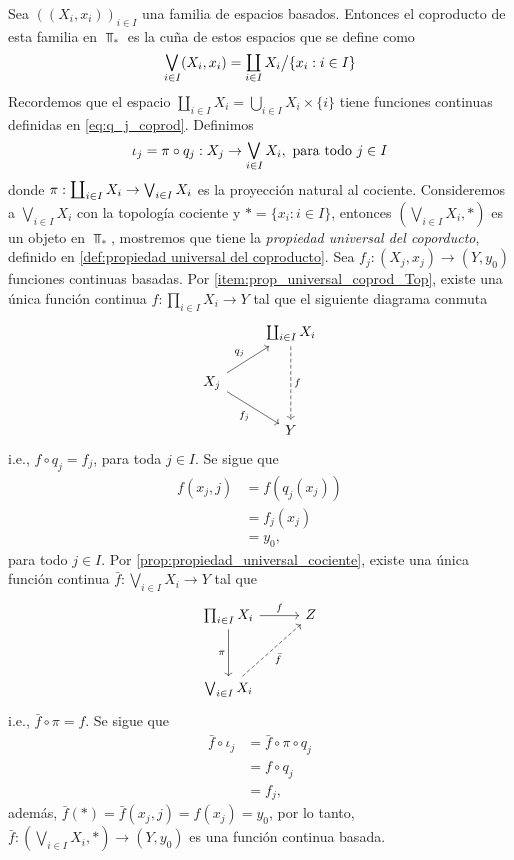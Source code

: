 \begin{ejemplo}
\label{eje: coproducto_Top_*}
    Sea $((X_i,x_i))_{i\in I}$ una familia de espacios basados. Entonces el coproducto de esta familia en $\Top_*$ es la cuña de estos espacios que se define como
    \[
    \medvee_{i\in I}(X_i,x_i)=\medcoprod_{i\in I}X_i\big/\{x_i:i\in I\}
    \]
    Recordemos que el espacio $\coprod_{i\in I}X_i=\bigcup_{i\in I}X_i\times\{i\}$ tiene funciones continuas definidas en \ref{eq:q_j_coprod}. Definimos 
    \begin{equation*}
        \iota_j=\pi\circ q_j:X_j\to\medvee_{i\in I} X_i,\text{ para todo } j\in I
    \end{equation*}
    donde $\pi:\medcoprod_{i\in I}X_i\to \bigvee_{i\in I} X_i$ es la proyección natural al cociente. Consideremos a $\bigvee_{i\in I} X_i$ con la topología cociente y $*=\{x_i:i\in I\}$, entonces $(\bigvee_{i\in I} X_i,*)$ es un objeto en $\Top_*$, mostremos que tiene la \textit{propiedad universal del coporducto}, definido en \ref{def:propiedad universal del coproducto}. Sea $f_j:(X_j,x_j)\to (Y,y_0)$ funciones continuas basadas. Por \ref{item:prop_universal_coprod_Top}, existe una única función continua $f:\prod_{i\in I}X_i\to Y$ tal que el siguiente diagrama conmuta
    \begin{equation}
\begin{tikzcd}[]
 &
 \coprod_{i\in I} X_i\arrow[dd,dashed,"f"] \\
    X_j\arrow[ur,"q_j"] \arrow[dr,"f_j"'] & \\
  & Y
\end{tikzcd}
\end{equation}  
i.e., $f\circ q_j=f_j$, para toda $j\in I$. Se sigue que
\begin{align*}
    f(x_j,j)&=f(q_j(x_j))\\
    &=f_j(x_j)\\
    &=y_0,
\end{align*}
para todo $j\in I$. Por \ref{prop:propiedad_universal_cociente}, existe una única función continua $\bar{f}:\bigvee_{i\in I}X_i\to Y$ tal que
\[
    \begin{tikzcd}[column sep=1cm, row sep=1.2cm] 
        \prod_{i\in I}X_i\arrow[r,"f"] \arrow[d,"\pi"'] & Z\\
        \bigvee_{i\in I}X_i \arrow[ur, dashed, "\bar{f}"']
    \end{tikzcd}
    \]
i.e., $\bar{f}\circ \pi=f$. Se sigue que 
\begin{align*}
    \bar{f}\circ \iota_j&=\bar{f}\circ\pi\circ q_j\\
    &=f\circ q_j\\
    &=f_j,
\end{align*}
además, $\bar{f}(*)=\bar{f}(x_j,j)=f(x_j)=y_0$, por lo tanto, $\bar{f}:(\bigvee_{i\in I}X_i,*)\to(Y,y_0)$ es una función continua basada. 
\end{ejemplo}
